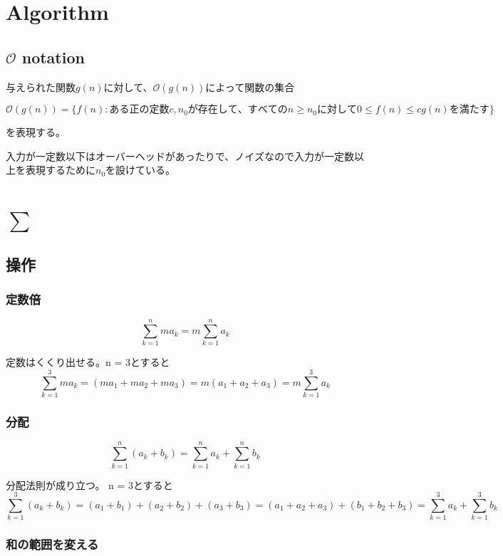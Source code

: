 \documentclass[dvipdfmx]{jsarticle}
\begin{document}
\section{Algorithm}

\subsection{$\mathcal{O}$ notation}

与えられた関数$g(n)$に対して、$\mathcal{O}(g(n))$によって関数の集合


\[ \mathcal{O}(g(n)) = \{ f(n): ある正の定数c, n_0が存在して、すべてのn \ge n_0に対して0 \le f(n) \le cg(n)を満たす\} \]


を表現する。

入力が一定数以下はオーバーヘッドがあったりで、ノイズなので入力が一定数以上を表現するために$n_0$を設けている。

\section{$\sum$}

\subsection{操作}

\subsubsection{定数倍}
\[ \sum_{k=1}^{n}ma_k = m\sum_{k=1}^{n}a_k \]

定数はくくり出せる。n = 3とすると
\[ \sum_{k=1}^{3}ma_k = (ma_1 + ma_2 + ma_3) = m(a_1 + a_2 + a_3) = m\sum_{k=1}^{3}a_k \]

\subsubsection{分配}

\[ \sum_{k=1}^{n}(a_k + b_k) = \sum_{k=1}^{n}a_k + \sum_{k=1}^{n}b_k  \]

分配法則が成り立つ。 n = 3とすると
\[ \sum_{k=1}^{3}(a_k + b_k) = (a_1 + b_1) + (a_2 + b_2) + (a_3 + b_3) = (a_1 + a_2 + a_3) + (b_1 + b_2 + b_3) = \sum_{k=1}^{3}a_k + \sum_{k=1}^{3}b_k \]

\subsubsection{和の範囲を変える}
\end{document}
